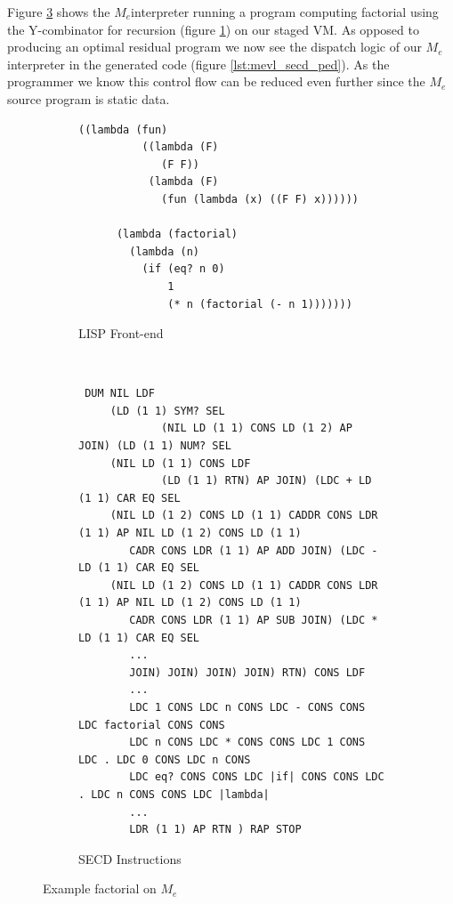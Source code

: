 \documentclass[a4paper,12pt,twoside,openright]{report}
\theoremstyle{definition}
\newcommand{\mevl}{$M_{e}$}
\begin{document}
Figure \ref{lst:mevl_secd_all} shows the \mevl interpreter running a program computing factorial using the Y-combinator for recursion (figure \ref{lst:mevl_secd_lisp}) on our staged VM. As opposed to producing an optimal residual program we now see the dispatch logic of our \mevl interpreter in the generated code (figure \ref{lst:mevl_secd_ped}). As the programmer we know this control flow can be reduced even further since the \mevl source program is static data.


\begin{figure}[htp!]
\centering
    \begin{subfigure}{.5\linewidth}
         \centering
         \begin{verbatim}
((lambda (fun)
          ((lambda (F)
             (F F))
           (lambda (F)
             (fun (lambda (x) ((F F) x))))))

      (lambda (factorial)
        (lambda (n)
          (if (eq? n 0)
              1
              (* n (factorial (- n 1)))))))
         \end{verbatim}
         \caption{LISP Front-end}
         \label{lst:mevl_secd_lisp}
    \end{subfigure}\\[1ex]
    \par\bigskip
    \begin{subfigure}{\linewidth}
         \centering
         \begin{verbatim}
 DUM NIL LDF
     (LD (1 1) SYM? SEL
             (NIL LD (1 1) CONS LD (1 2) AP JOIN) (LD (1 1) NUM? SEL
     (NIL LD (1 1) CONS LDF
             (LD (1 1) RTN) AP JOIN) (LDC + LD (1 1) CAR EQ SEL
     (NIL LD (1 2) CONS LD (1 1) CADDR CONS LDR (1 1) AP NIL LD (1 2) CONS LD (1 1)
        CADR CONS LDR (1 1) AP ADD JOIN) (LDC - LD (1 1) CAR EQ SEL
     (NIL LD (1 2) CONS LD (1 1) CADDR CONS LDR (1 1) AP NIL LD (1 2) CONS LD (1 1)
        CADR CONS LDR (1 1) AP SUB JOIN) (LDC * LD (1 1) CAR EQ SEL
        ...
        JOIN) JOIN) JOIN) JOIN) RTN) CONS LDF
        ...
        LDC 1 CONS LDC n CONS LDC - CONS CONS LDC factorial CONS CONS
        LDC n CONS LDC * CONS CONS LDC 1 CONS LDC . LDC 0 CONS LDC n CONS
        LDC eq? CONS CONS LDC |if| CONS CONS LDC . LDC n CONS CONS LDC |lambda|
        ...
        LDR (1 1) AP RTN ) RAP STOP
         \end{verbatim}
    \caption{SECD Instructions}
    \label{lst:mevl_secd_ops}
    \end{subfigure}
\caption{Example factorial on \mevl}
\label{lst:mevl_secd_all}
\end{figure}
\end{document}
